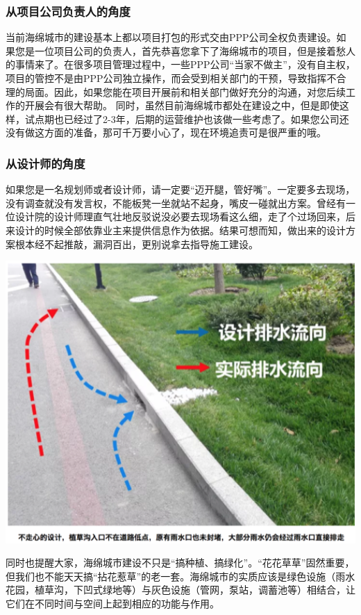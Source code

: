 \documentclass[]{book}
\begin{document}
\subsubsection{从项目公司负责人的角度}

当前海绵城市的建设基本上都以项目打包的形式交由PPP公司全权负责建设。如果您是一位项目公司的负责人，首先恭喜您拿下了海绵城市的项目，但是接着愁人的事情来了。在很多项目管理过程中，一些PPP公司``当家不做主''，没有自主权，项目的管控不是由PPP公司独立操作，而会受到相关部门的干预，导致指挥不合理的局面。因此，如果您能在项目开展前和相关部门做好充分的沟通，对您后续工作的开展会有很大帮助。
同时，虽然目前海绵城市都处在建设之中，但是即使这样，试点期也已经过了2-3年，后期的运营维护也该做一些考虑了。如果您公司还没有做这方面的准备，那可千万要小心了，现在环境追责可是很严重的哦。

\subsubsection{从设计师的角度}

如果您是一名规划师或者设计师，请一定要``迈开腿，管好嘴''。一定要多去现场，没有调查就没有发言权，不能板凳一坐就站不起身，嘴皮一碰就出方案。曾经有一位设计院的设计师理直气壮地反驳说没必要去现场看这么细，走了个过场回来，后来设计的时候全部依靠业主来提供信息作为依据。结果可想而知，做出来的设计方案根本经不起推敲，漏洞百出，更别说拿去指导施工建设。

\includegraphics[width=6.67in]{images/ch7}

同时也提醒大家，海绵城市建设不只是``搞种植、搞绿化''。``花花草草''固然重要，但我们也不能天天搞``拈花惹草''的老一套。海绵城市的实质应该是绿色设施（雨水花园，植草沟，下凹式绿地等）与灰色设施（管网，泵站，调蓄池等）相结合，让它们在不同时间与空间上起到相应的功能与作用。
\end{document}
